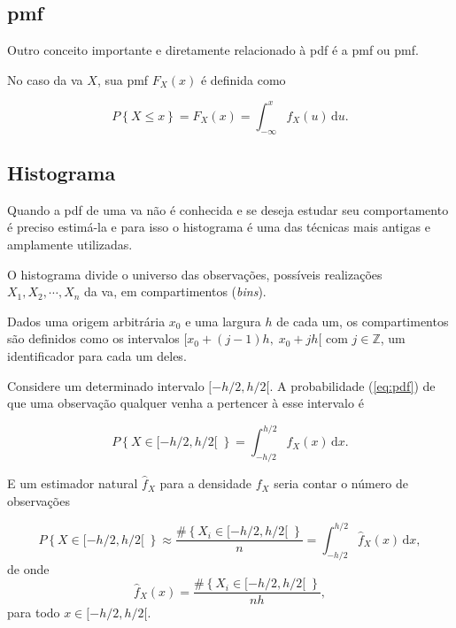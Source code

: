 \subsection{\Glsdesc{pmf}}
\label{sec:pmf}

Outro conceito importante e diretamente relacionado à \gls{pdf} é a
\gls{pmf} ou \glsdesc*{pmf}.

No caso da \gls{va} $X$, sua \gls{pmf} $F_X(x)$ é definida como

\begin{equation}
	P \left\{ X \leq x\right\} = F_X(x) = \int_{-\infty}^{x}\!f_X(u)\,\mathrm{d}u.
	\label{eq:pmf}
\end{equation}



\subsection{Histograma}
\label{sec:histogram}

Quando a \gls{pdf} de uma \gls{va} não é conhecida e se deseja estudar seu comportamento
é preciso estimá-la e para isso o histograma é uma das técnicas mais antigas e amplamente utilizadas.

O histograma divide o universo das observações, possíveis realizações $X_1, X_2,\cdots, X_n$
da \gls{va}, em compartimentos (\emph{bins}).

Dados uma origem arbitrária $x_0$ e uma largura $h$ de cada um, os compartimentos
são definidos como os intervalos $[x_0 + (j -1)h,\; x_0 + jh[$ 
com $j\in\mathbb{Z}$, um identificador para cada um deles. 

Considere um determinado intervalo $[-h/2, h/2[$. 
A probabilidade (\eqref{eq:pdf}) de que uma observação qualquer venha a pertencer à esse intervalo é

\begin{equation}
	P \left\{ X \in [-h/2,h/2[ \; \right\} = \int_{-h/2}^{h/2}\!f_X(x)\,\mathrm{d}x.
	\label{eq:hist01}
\end{equation}

E um estimador natural $\hat{f}_X$ para a densidade $f_X$ seria contar o número de observações

\begin{equation}
	P \left\{ X \in [-h/2,h/2[ \; \right\} \approx \frac{\# \left\{ X_i \in [-h/2,h/2[ \; \right\}}{n} =
	\int_{-h/2}^{h/2}\!\hat{f}_X(x)\,\mathrm{d}x ,
	\label{eq:hist02}
\end{equation}
de onde 
\begin{equation}
	\hat{f}_X(x) = \frac{\# \left\{ X_i \in [-h/2,h/2[ \; \right\}}{nh},
	\label{eq:hist_03}
\end{equation}
para todo $x \in [-h/2,h/2[$.

